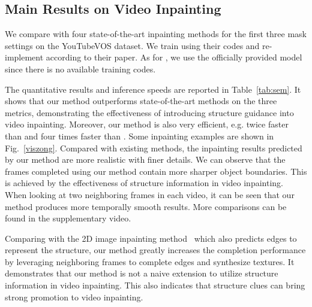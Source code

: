 \subsection{Main Results on Video Inpainting}

We compare with four state-of-the-art inpainting methods for the first three mask settings on the YouTubeVOS dataset.
%
We train \cite{nazeri2019edgeconnect,Xu_2019_CVPR} using their codes and re-implement \cite{wang2019video} according to their paper. As for \cite{Kim_2019_CVPR1}, we use the officially provided model since there is no available training codes.

The quantitative results and inference speeds are reported in Table~\ref{tab:sem}.
It shows that our method outperforms state-of-the-art methods on the three metrics, demonstrating the effectiveness of introducing structure guidance into video inpainting.
Moreover, our method is also very efficient, e.g. twice faster than \cite{Kim_2019_CVPR1} and four times faster than \cite{Xu_2019_CVPR}. 
%
Some inpainting examples are shown in Fig.~\ref{viszong}.
Compared with existing methods, the inpainting results predicted by our method are more realistic with finer details. 
We can observe that the frames completed using our method contain more sharper object boundaries. This is achieved by the effectiveness of structure information in video inpainting.
%
When looking at two neighboring frames in each video, it can be seen that our method produces more temporally smooth results. More comparisons can be found in the supplementary video.




Comparing with the 2D image inpainting method~\cite{nazeri2019edgeconnect} which also predicts edges to represent the structure, our method greatly increases the completion performance by leveraging neighboring frames to complete edges and synthesize textures. 
%
It demonstrates that our method is not a naive extension to utilize structure information in video inpainting.
This also indicates that structure clues can bring strong promotion to video inpainting.


 

%





